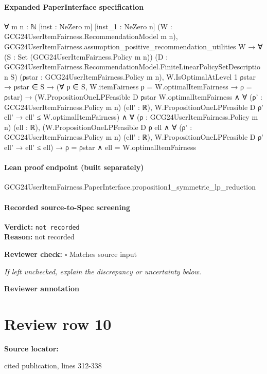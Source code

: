 \documentclass[10pt]{article}
\newcommand{\reviewerbox}{%
  \par\noindent\fbox{\parbox{0.96\linewidth}{\rule{0pt}{0.38in}}}\par
}
\newcommand{\reviewmatch}[1]{%
  \par\noindent\textbf{Reviewer check:} $\square$\; #1\par
  \noindent\emph{If left unchecked, explain the discrepancy or uncertainty below.}\par
}
\begin{document}
\paragraph{Expanded PaperInterface specification}
\begin{ReviewVerbatim}
∀ {m n : ℕ} [inst : NeZero m] [inst_1 : NeZero n] (W : GCG24UserItemFairness.RecommendationModel m n),
  GCG24UserItemFairness.assumption_positive_recommendation_utilities W →
    ∀ (S : Set (GCG24UserItemFairness.Policy m n))
      (D : GCG24UserItemFairness.RecommendationModel.FiniteLinearPolicySetDescription S)
      (ρstar : GCG24UserItemFairness.Policy m n),
      W.IsOptimalAtLevel 1 ρstar →
        ρstar ∈ S →
          (∀ ρ ∈ S, W.itemFairness ρ = W.optimalItemFairness → ρ = ρstar) →
            (W.PropositionOneLPFeasible D ρstar W.optimalItemFairness ∧
                ∀ (ρ' : GCG24UserItemFairness.Policy m n) (ell' : ℝ),
                  W.PropositionOneLPFeasible D ρ' ell' → ell' ≤ W.optimalItemFairness) ∧
              ∀ (ρ : GCG24UserItemFairness.Policy m n) (ell : ℝ),
                (W.PropositionOneLPFeasible D ρ ell ∧
                    ∀ (ρ' : GCG24UserItemFairness.Policy m n) (ell' : ℝ),
                      W.PropositionOneLPFeasible D ρ' ell' → ell' ≤ ell) →
                  ρ = ρstar ∧ ell = W.optimalItemFairness
\end{ReviewVerbatim}

\paragraph{Lean proof endpoint (built separately)}\begin{ReviewVerbatim}
GCG24UserItemFairness.PaperInterface.proposition1_symmetric_lp_reduction
\end{ReviewVerbatim}

\paragraph{Recorded source-to-Spec screening}
\textbf{Verdict:} \texttt{not recorded}
\\
\textbf{Reason:} not recorded
\reviewmatch{Matches source input}
\noindent\textbf{Reviewer annotation}\par
\reviewerbox
\clearpage
\hypertarget{source-claim-886aec0cf4d20216}{}
\section*{Review row 10}
\textbf{Source locator:} {\footnotesize\raggedright cited publication, lines 312-\allowbreak{}338\par}
\end{document}
